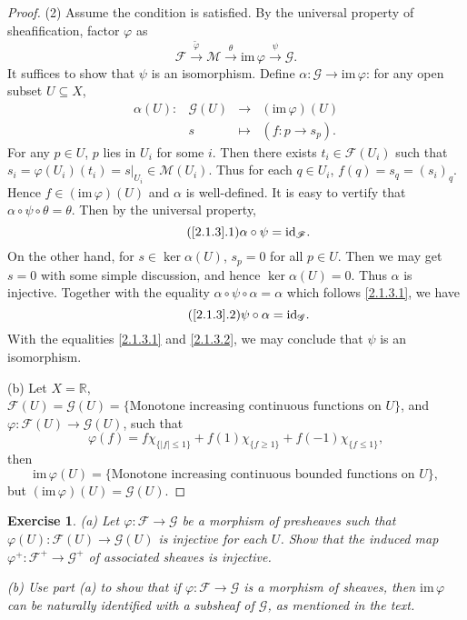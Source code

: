 \documentclass[12pt]{amsart}
\newtheorem{exe}{Exercise}[subsection]
\begin{document}
\begin{proof}
    (2) Assume the condition is satisfied. By the universal property of sheafification, factor $\varphi$ as $$\mathscr{F}\xrightarrow{\tilde{\varphi}}\mathscr{M}\xrightarrow{\theta}\mathrm{im}\,\varphi\xrightarrow{\psi}\mathscr{G}.$$It suffices to show that $\psi$ is an isomorphism. Define $\alpha:\mathscr{G}\to\mathrm{im}\,\varphi$: for any open subset $U\subseteq X$,
    \begin{equation*}
    \begin{matrix}
    \alpha(U):&\mathscr{G}(U)&\longrightarrow&(\mathrm{im}\,\varphi)(U)\\
    &s&\longmapsto&(f:p\to s_p).
    \end{matrix}
    \end{equation*}
    For any $p\in U$, $p$ lies in $U_i$ for some $i$. Then there exists $t_i\in\mathscr{F}(U_i)$ such that $s_i=\varphi(U_i)(t_i)=s|_{U_i}\in\mathscr{M}(U_i)$. Thus for each $q\in U_i$, $f(q)=s_q=(s_i)_q$. Hence $f\in(\mathrm{im}\,\varphi)(U)$ and $\alpha$ is well-defined. It is easy to vertify that $\alpha\circ\psi\circ\theta=\theta$. Then by the universal property,
    \begin{equation}
    \tag{\ref*{2.1.3}.1}
    \label{2.1.3.1}
    \alpha\circ\psi=\mathrm{id}_{\mathscr{F}}.
    \end{equation}
    On the other hand, for $s\in\ker\alpha(U)$, $s_p=0$ for all $p\in U$. Then we may get $s=0$ with some simple discussion, and hence $\ker\alpha(U)=0$. Thus $\alpha$ is injective. Together with the equality $\alpha\circ\psi\circ\alpha=\alpha$ which follows \eqref{2.1.3.1}, we have
    \begin{equation}
    \tag{\ref*{2.1.3}.2}
    \label{2.1.3.2}
    \psi\circ\alpha=\mathrm{id}_\mathscr{G}.
    \end{equation}
    With the equalities \eqref{2.1.3.1} and \eqref{2.1.3.2}, we may conclude that $\psi$ is an isomorphism.

    (b) Let $X=\mathbb{R}$, $\mathscr{F}(U)=\mathscr{G}(U)=\{\text{Monotone increasing continuous functions on }U\}$, and 
    $\varphi:\mathscr{F}(U) \rightarrow  \mathscr{G}(U)$, such that $$\varphi(f)=f\chi_{\{|f|\leq1\}}+f(1)\chi_{\{f\geq1\}}+ f(-1)\chi_{\{f\leq1\}},$$then $$\mathrm{im}\,\varphi(U)=\{\text{Monotone increasing continuous bounded functions on }U\},$$ but $(\mathrm{im}\,\varphi)(U)= \mathscr{G}(U)$.
\end{proof}

\begin{exe}
	\label{2.1.4}
    (a) Let $\varphi :\mathscr{F} \rightarrow  \mathscr{G} $ be a morphism of presheaves such that $\varphi(U) :\mathscr{F}(U) \rightarrow  \mathscr{G}(U) $
    is injective for each $U$. Show that the induced map $\varphi^+ :\mathscr{F}^+ \rightarrow  \mathscr{G}^+ $ of associated sheaves
    is injective.

    (b) Use part (a) to show that if $\varphi :\mathscr{F} \rightarrow  \mathscr{G} $ is a morphism of sheaves,
    then $\mathrm{im}\,\varphi$ can be naturally identified with a subsheaf of $ \mathscr{G}$, as mentioned in the text.
\end{exe}
\end{document}
